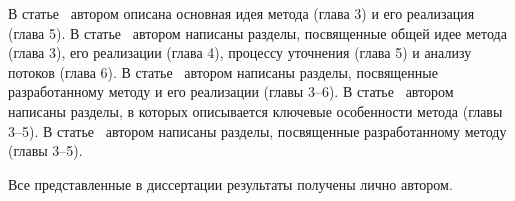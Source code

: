 В статье~\cite{lockatorVAK} автором описана основная идея метода (глава 3) и его реализация (глава 5).
В статье~\cite{lockatorVAK2} автором написаны разделы, посвященные общей идее метода (глава 3), его реализации (глава 4), процессу уточнения (глава 5) и анализу потоков (глава 6).
В статье~\cite{TMPA2017} автором написаны разделы, посвященные разработанному методу и его реализации (главы 3--6).
В статье~\cite{lockatorSyrcose} автором написаны разделы, в которых описывается ключевые особенности метода (главы 3--5).
В статье~\cite{lockatorTMPA} автором написаны разделы, посвященные разработанному методу (главы 3--5).

{\contribution} Все представленные в диссертации результаты получены лично автором.